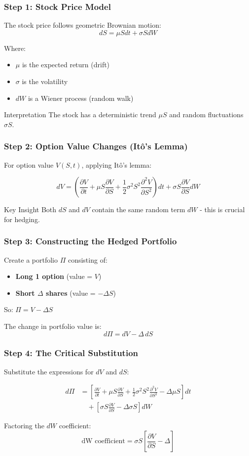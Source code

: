 \documentclass{beamer}
\begin{document}
\begin{frame}
\frametitle{Step 1: Stock Price Model}
The stock price follows geometric Brownian motion:
$$dS = \mu S dt + \sigma S dW$$

Where:
\begin{itemize}
\item $\mu$ is the expected return (drift)
\item $\sigma$ is the volatility  
\item $dW$ is a Wiener process (random walk)
\end{itemize}

\begin{block}{Interpretation}
The stock has a deterministic trend $\mu S$ and random fluctuations $\sigma S$.
\end{block}
\end{frame}

\begin{frame}
\frametitle{Step 2: Option Value Changes (Itô's Lemma)}
For option value $V(S,t)$, applying Itô's lemma:

$$dV = \left(\frac{\partial V}{\partial t} + \mu S \frac{\partial V}{\partial S} + \frac{1}{2}\sigma^2 S^2 \frac{\partial^2 V}{\partial S^2}\right) dt + \sigma S \frac{\partial V}{\partial S} dW$$

\begin{block}{Key Insight}
Both $dS$ and $dV$ contain the same random term $dW$ - this is crucial for hedging.
\end{block}
\end{frame}

\begin{frame}
\frametitle{Step 3: Constructing the Hedged Portfolio}
Create a portfolio $\Pi$ consisting of:
\begin{itemize}
\item \textbf{Long 1 option} (value = $V$)
\item \textbf{Short $\Delta$ shares} (value = $-\Delta S$)
\end{itemize}

So: $\Pi = V - \Delta S$

The change in portfolio value is:
$$d\Pi = dV - \Delta \, dS$$
\end{frame}

\begin{frame}
\frametitle{Step 4: The Critical Substitution}
Substitute the expressions for $dV$ and $dS$:

\begin{align}
d\Pi &= \left[\frac{\partial V}{\partial t} + \mu S \frac{\partial V}{\partial S} + \frac{1}{2}\sigma^2 S^2 \frac{\partial^2 V}{\partial S^2} - \Delta\mu S\right] dt \\
&\quad + \left[\sigma S \frac{\partial V}{\partial S} - \Delta\sigma S\right] dW
\end{align}

Factoring the $dW$ coefficient:
$$\text{dW coefficient} = \sigma S\left[\frac{\partial V}{\partial S} - \Delta\right]$$
\end{frame}
\end{document}
